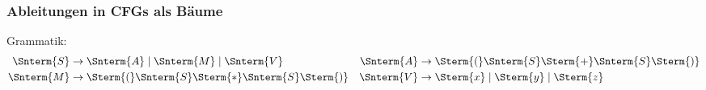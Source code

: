 \documentclass[aspectratio=1610,onlymath]{beamer}
\begin{document}
\maketitle


\begin{frame}\frametitle{Ableitungen in CFGs als Bäume}

\begin{minipage}{4cm}
Grammatik:
\begin{align*}
\Snterm{S} &\to \Snterm{A}\mid \Snterm{M}\mid \Snterm{V} &
\Snterm{A} &\to \Sterm{(}\Snterm{S}\Sterm{+}\Snterm{S}\Sterm{)} \\
\Snterm{M} &\to \Sterm{(}\Snterm{S}\Sterm{*}\Snterm{S}\Sterm{)} &
\Snterm{V} &\to \Sterm{x}\mid\Sterm{y}\mid\Sterm{z}
\end{align*}


\end{minipage}
\end{frame}
\end{document}
